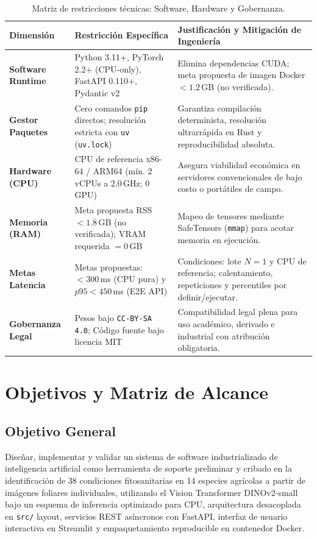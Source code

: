 \documentclass[12pt,letterpaper]{article}
\begin{document}
\begin{table}[!htbp]
\centering
\caption{Matriz de restricciones técnicas: Software, Hardware y Gobernanza.}
\label{tab:restricciones}
\footnotesize
\setlength{\tabcolsep}{4.5pt}
\begin{tabularx}{\textwidth}{p{2.5cm} p{5.1cm} X}
\toprule
\textbf{Dimensión} & \textbf{Restricción Específica} & \textbf{Justificación y Mitigación de Ingeniería} \\
\midrule
\textbf{Software Runtime} & Python 3.11+, PyTorch 2.2+ (CPU-only), FastAPI 0.110+, Pydantic v2 & Elimina dependencias CUDA; meta propuesta de imagen Docker $< 1.2$\,GB (no verificada). \\
\textbf{Gestor Paquetes} & Cero comandos \texttt{pip} directos; resolución estricta con \texttt{uv} (\texttt{uv.lock}) & Garantiza compilación determinista, resolución ultrarrápida en Rust y reproducibilidad absoluta. \\
\textbf{Hardware (CPU)} & CPU de referencia x86-64 / ARM64 (mín. 2 vCPUs a 2.0\,GHz; 0 GPU) & Asegura viabilidad económica en servidores convencionales de bajo costo o portátiles de campo. \\
\textbf{Memoria (RAM)} & Meta propuesta RSS $< 1.8$\,GB (no verificada); VRAM requerida $= 0$\,GB & Mapeo de tensores mediante SafeTensors (\texttt{mmap}) para acotar memoria en ejecución. \\
\textbf{Metas Latencia} & Metas propuestas: $< 300$\,ms (CPU pura) y $p95 < 450$\,ms (E2E API) & Condiciones: lote $N=1$ y CPU de referencia; calentamiento, repeticiones y percentiles por definir/ejecutar. \\
\textbf{Gobernanza Legal} & Pesos bajo \texttt{CC-BY-SA 4.0}; Código fuente bajo licencia MIT & Compatibilidad legal plena para uso académico, derivado e industrial con atribución obligatoria. \\
\bottomrule
\end{tabularx}
\end{table}

\FloatBarrier
\section{Objetivos y Matriz de Alcance}

\subsection{Objetivo General}
Diseñar, implementar y validar un sistema de software industrializado de inteligencia artificial como herramienta de soporte preliminar y cribado en la identificación de 38 condiciones fitosanitarias en 14 especies agrícolas a partir de imágenes foliares individuales, utilizando el Vision Transformer DINOv2-small bajo un esquema de inferencia optimizado para CPU, arquitectura desacoplada en \texttt{src/} layout, servicios REST asíncronos con FastAPI, interfaz de usuario interactiva en Streamlit y empaquetamiento reproducible en contenedor Docker.
\end{document}
